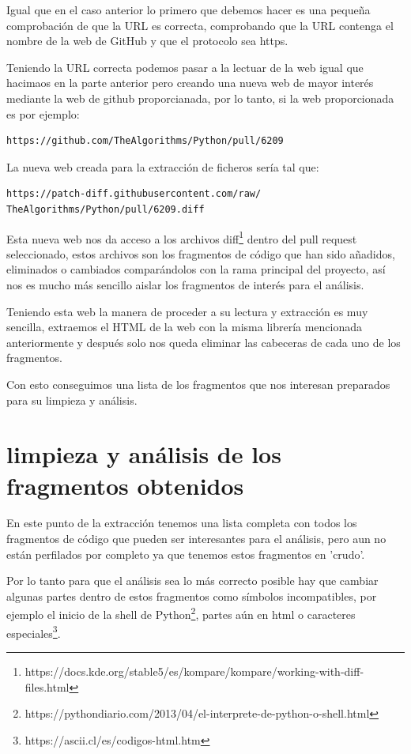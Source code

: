 \documentclass[a4paper, 12pt]{book}
\begin{document}
Igual que en el caso anterior lo primero que debemos hacer es una pequeña comprobación de que la URL es correcta, comprobando que la URL contenga el nombre de la web de GitHub y que el protocolo sea https.

Teniendo la URL correcta podemos pasar a la lectuar de la web igual que hacimaos en la parte anterior pero creando una nueva web de mayor interés mediante la web de github proporcianada, por lo tanto, si la web proporcionada es por ejemplo:
\begin{verbatim}
https://github.com/TheAlgorithms/Python/pull/6209
\end{verbatim}

La nueva web creada para la extracción de ficheros sería tal que:

\begin{verbatim}
https://patch-diff.githubusercontent.com/raw/
TheAlgorithms/Python/pull/6209.diff
\end{verbatim} 

Esta nueva web nos da acceso a los archivos diff\footnote{https://docs.kde.org/stable5/es/kompare/kompare/working-with-diff-files.html} dentro del pull request seleccionado, estos archivos son los fragmentos de código que han sido añadidos, eliminados o cambiados comparándolos con la rama principal del proyecto, así nos es mucho más sencillo aislar los fragmentos de interés para el análisis.

Teniendo esta web la manera de proceder a su lectura y extracción es muy sencilla, extraemos el HTML de la web con la misma librería mencionada anteriormente y después solo nos queda eliminar las cabeceras de cada uno de los fragmentos.

Con esto conseguimos una lista de los fragmentos que nos interesan preparados para su limpieza y análisis.

\section{limpieza y análisis de los fragmentos obtenidos} 
\label{sec:limpieza y análisis de los fragmentos obtenidos}

En este punto de la extracción tenemos una lista completa con todos los fragmentos de código que pueden ser interesantes para el análisis, pero aun no están perfilados por completo ya que tenemos estos fragmentos en 'crudo'.

Por lo tanto para que el análisis sea lo más correcto posible hay que cambiar algunas partes dentro de estos fragmentos como símbolos incompatibles, por ejemplo el inicio de la shell de Python\footnote{https://pythondiario.com/2013/04/el-interprete-de-python-o-shell.html}, partes aún en html o caracteres especiales\footnote{https://ascii.cl/es/codigos-html.htm}.
\end{document}
